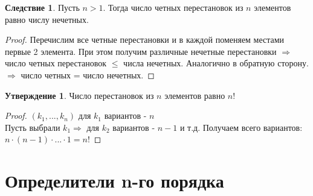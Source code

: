\documentclass[a4paper, 12pt]{article}
\theoremstyle{definition}
\newtheorem*{consequense}{Следствие}
\newtheorem*{subtheorem}{Утверждение}
\begin{document}
  \begin{consequense}
    Пусть $n>1$. Тогда число четных перестановок из $n$ элементов равно числу нечетных. 
  \end{consequense} 
  \begin{proof}
    Перечислим все четные перестановки и в каждой поменяем местами первые 2 элемента. При этом получим различные нечетные перестановки $\Longrightarrow $ число четных перестановок $\leq$ числа нечетных. Аналогично в обратную сторону. \\
    $\Longrightarrow $ число четных = число нечетных. 
  \end{proof} 
  \begin{subtheorem}
    Число перестановок из $n$ элементов равно $n!$ 
  \end{subtheorem} 
  \begin{proof}
    $(k_1,...,k_n)$ для $k_1$ вариантов - $n$  \\
    Пусть выбрали $k_1 \Longrightarrow$ для  $k_2$ вариантов - $n-1$ и т.д. Получаем всего вариантов: $n\cdot(n-1)\cdot ... \cdot 1 = n! $ 
  \end{proof} 

  \newpage
  
  \section{Определители n-го порядка}
\end{document}
